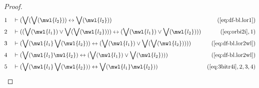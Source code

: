 \begin{proof}
\begin{align}
  1 &&  & \vdash ( \bigvee( \bigvee( \mwl{l_2} ) ) \leftrightarrow \bigvee(
     \mwl{l_2} ) )&(\mbox{\ref{eq:df-bl.lor1}})\notag
  \\ 2 &&  & \vdash ( ( \bigvee( \mwl{l_1} ) \vee \bigvee( \bigvee( \mwl{l_2} )
     ) ) \leftrightarrow ( \bigvee( \mwl{l_1} ) \vee
     \bigvee( \mwl{l_2} ) )
     )&(\mbox{\ref{eq:orbi2i}},1)\notag
  \\ 3 &&  & \vdash ( \bigvee( \mwl{l_1} \bigvee( \mwl{l_2} ) ) \leftrightarrow
     ( \bigvee( \mwl{l_1} ) \vee \bigvee( \bigvee(
     \mwl{l_2} ) ) )
     )&(\mbox{\ref{eq:df-bl.lor2wl}})\notag
  \\ 4 &&  & \vdash ( \bigvee( \mwl{l_1} \mwl{l_2} ) \leftrightarrow ( \bigvee(
     \mwl{l_1} ) \vee \bigvee( \mwl{l_2} ) )
     )&(\mbox{\ref{eq:df-bl.lor2wl}})\notag
  \\ 5 &&  & \vdash ( \bigvee( \mwl{l_1} \bigvee( \mwl{l_2} ) ) \leftrightarrow
     \bigvee( \mwl{l_1} \mwl{l_2} )
     )&(\mbox{\ref{eq:3bitr4i}},2,3,4)\notag
\end{align}
\end{proof}


